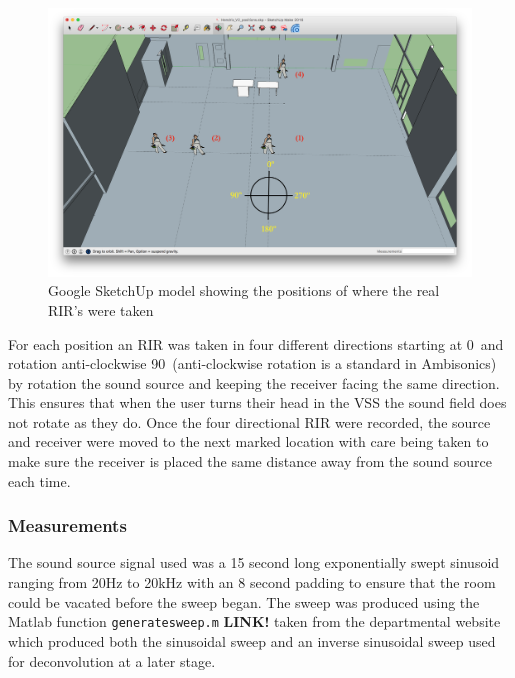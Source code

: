 \documentclass[../../main.tex]{subfiles}
\begin{document}
		\begin{figure}[H]
			\begin{center}
				\includegraphics[scale = 0.3]{Sections/Implementation/RealRIRs/images/Real_RIRs7_editV2.png} 
				\caption{Google SketchUp model showing the positions of where the real \ac{RIR}'s were taken}
				\label{rirPositions}
			\end{center}
		\end{figure}

	For each position an \ac{RIR} was taken in four different directions  starting at 0\textdegree~and rotation anti-clockwise 90\textdegree~(anti-clockwise rotation is a standard in Ambisonics) by rotation the sound source and keeping the receiver facing the same direction. This ensures that when the user turns their head in the \ac{VSS} the sound field does not rotate as they do. Once the four directional \ac{RIR} were recorded, the source and receiver were moved to the next marked location with care being taken to make sure the receiver is placed the same distance away from the sound source each time.

	\subsubsection{Measurements}
		The sound source signal used was a 15 second long exponentially swept sinusoid ranging from 20Hz to 20kHz with an 8 second padding to ensure that the room could be vacated before the sweep began. The sweep was produced using the Matlab function \texttt{generatesweep.m} \textbf{LINK!} taken from the departmental website \cite{sineSweep} which produced both the sinusoidal sweep and an inverse sinusoidal sweep used for deconvolution at a later stage.
		
\end{document}
